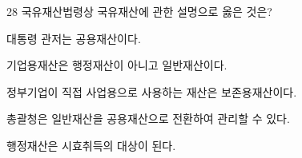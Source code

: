 \begin{question}{28}
국유재산법령상 국유재산에 관한 설명으로 옳은 것은?
\begin{choices}
  \item 대통령 관저는 공용재산이다.
  \item 기업용재산은 행정재산이 아니고 일반재산이다.
  \item 정부기업이 직접 사업용으로 사용하는 재산은 보존용재산이다.
  \item 총괄청은 일반재산을 공용재산으로 전환하여 관리할 수 있다.
  \item 행정재산은 시효취득의 대상이 된다.
\end{choices}
\end{question}

